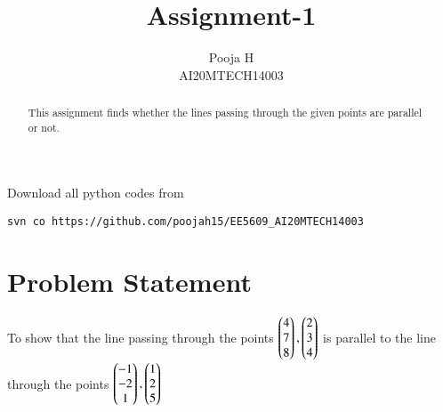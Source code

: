 \documentclass[journal,12pt,twocolumn]{IEEEtran}
\begin{document}
\let\vec\mathbf
\renewcommand{\thefigure}{\theproblem}
\def\putbox#1#2#3{\makebox[0in][l]{\makebox[#1][l]{}\raisebox{\baselineskip}[0in][0in]{\raisebox{#2}[0in][0in]{#3}}}}
     \def\rightbox#1{\makebox[0in][r]{#1}}
     \def\centbox#1{\makebox[0in]{#1}}
     \def\topbox#1{\raisebox{-\baselineskip}[0in][0in]{#1}}
     \def\midbox#1{\raisebox{-0.5\baselineskip}[0in][0in]{#1}}
\vspace{3cm}
\title{Assignment-1}
\author{Pooja H \\ AI20MTECH14003}
\maketitle
\newpage
\bigskip
\renewcommand{\thefigure}{\theenumi}
\renewcommand{\thetable}{\theenumi}
\begin{abstract}
This assignment finds whether the lines passing through the given points are parallel or not.
\end{abstract}
Download all python codes from 

\begin{lstlisting}
svn co https://github.com/poojah15/EE5609_AI20MTECH14003
\end{lstlisting}


\section{Problem Statement}
To show that the line passing through the points $\begin{pmatrix}4\\7\\8\end{pmatrix}, \begin{pmatrix}2\\3\\4\end{pmatrix}$ is parallel to the line through the points $\begin{pmatrix}-1\\-2\\1\end{pmatrix}, \begin{pmatrix}1\\2\\5\end{pmatrix}$
\end{document}
